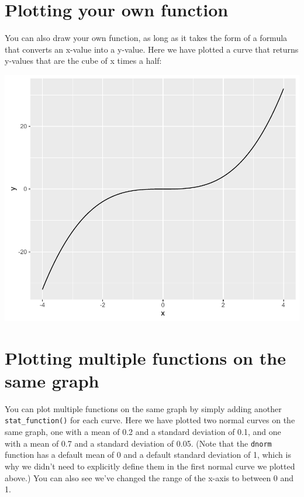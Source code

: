 \section{Plotting your own function}\label{plotting-your-own-function}

You can also draw your own function, as long as it takes the form of a
formula that converts an x-value into a y-value. Here we have plotted a
curve that returns y-values that are the cube of x times a half:

\begin{Shaded}
\begin{Highlighting}[]
\StringTok{ }
     \NormalTok{*}\StringTok{ }
\NormalTok{\}}

\StringTok{ }\NormalTok{(}\NormalTok{(} \NormalTok{(-}\NormalTok{, }\NormalTok{)), }\NormalTok{(} 
\StringTok{  }\NormalTok{(} 
\end{Highlighting}
\end{Shaded}

\begin{center}\includegraphics[width=0.6\linewidth]{9_Function_Plots_pdf/function_3-1} \end{center}

\section{Plotting multiple functions on the same
graph}\label{plotting-multiple-functions-on-the-same-graph}

You can plot multiple functions on the same graph by simply adding
another \texttt{stat\_function()} for each curve. Here we have plotted
two normal curves on the same graph, one with a mean of 0.2 and a
standard deviation of 0.1, and one with a mean of 0.7 and a standard
deviation of 0.05. (Note that the \texttt{dnorm} function has a default
mean of 0 and a default standard deviation of 1, which is why we didn't
need to explicitly define them in the first normal curve we plotted
above.) You can also see we've changed the range of the x-axis to
between 0 and 1.

